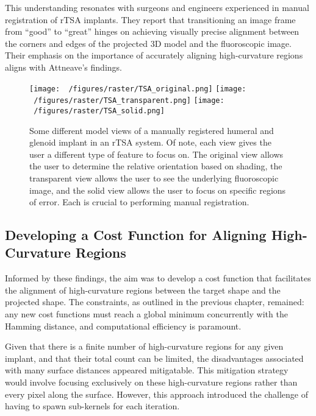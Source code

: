 This understanding resonates with surgeons and engineers experienced in manual registration of rTSA implants.
They report that transitioning an image frame from “good” to “great” hinges on achieving visually precise alignment between the corners and edges of the projected 3D model and the fluoroscopic image.
Their emphasis on the importance of accurately aligning high-curvature regions aligns with Attneave's findings.


\begin{figure}[h!]
  \centering
  \texttt{[image: ~/figures/raster/TSA\_original.png]}
  \texttt{[image: ~/figures/raster/TSA\_transparent.png]}
  \texttt{[image: ~/figures/raster/TSA\_solid.png]}
  \caption[Some different model views of a manually registered humeral and glenoid implant in an rTSA system]{Some different model views of a manually registered humeral and glenoid implant in an rTSA system. Of note, each view gives the user a different type of feature to focus on. The original view allows the user to determine the relative orientation based on shading, the transparent view allows the user to see the underlying fluoroscopic image, and the solid view allows the user to focus on specific regions of error. Each is crucial to performing manual registration.}
  \label{fig:TSA-multiview}
\end{figure}

\subsection{Developing a Cost Function for Aligning High-Curvature Regions}

Informed by these findings, the aim was to develop a cost function that facilitates the alignment of high-curvature regions between the target shape and the projected shape.
The constraints, as outlined in the previous chapter, remained: any new cost functions must reach a global minimum concurrently with the Hamming distance, and computational efficiency is paramount.

Given that there is a finite number of high-curvature regions for any given implant, and that their total count can be limited, the disadvantages associated with many surface distances appeared mitigatable.
This mitigation strategy would involve focusing exclusively on these high-curvature regions rather than every pixel along the surface.
However, this approach introduced the challenge of having to spawn sub-kernels for each iteration.


